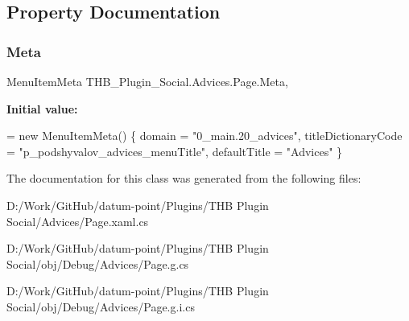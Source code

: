 \subsection{Property Documentation}
\mbox{\label{class_t_h_b___plugin___social_1_1_advices_1_1_page_ac0942177dab031b84b27f88368f28c5e}} 
\subsubsection{\texorpdfstring{Meta}{Meta}}
{\footnotesize\ttfamily Menu\+Item\+Meta T\+H\+B\+\_\+\+Plugin\+\_\+\+Social.\+Advices.\+Page.\+Meta\hspace{0.3cm}{\ttfamily [get]}, {\ttfamily [set]}}

{\bfseries Initial value\+:}
\begin{DoxyCode}
= \textcolor{keyword}{new} MenuItemMeta()
        \{
            domain = \textcolor{stringliteral}{"0\_main.20\_advices"},
            titleDictionaryCode = \textcolor{stringliteral}{"p\_podshyvalov\_advices\_menuTitle"},
            defaultTitle = \textcolor{stringliteral}{"Advices"}
        \}
\end{DoxyCode}


The documentation for this class was generated from the following files\+:\begin{DoxyCompactItemize}
\item 
D\+:/\+Work/\+Git\+Hub/datum-\/point/\+Plugins/\+T\+H\+B Plugin Social/\+Advices/Page.\+xaml.\+cs\item 
D\+:/\+Work/\+Git\+Hub/datum-\/point/\+Plugins/\+T\+H\+B Plugin Social/obj/\+Debug/\+Advices/Page.\+g.\+cs\item 
D\+:/\+Work/\+Git\+Hub/datum-\/point/\+Plugins/\+T\+H\+B Plugin Social/obj/\+Debug/\+Advices/Page.\+g.\+i.\+cs\end{DoxyCompactItemize}

